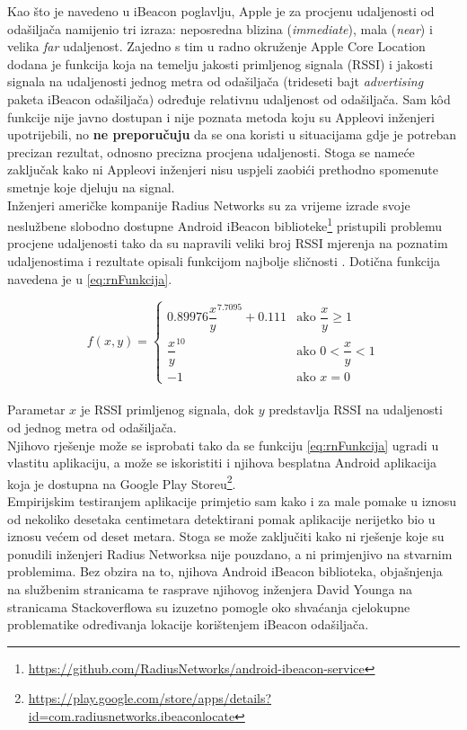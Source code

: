 Kao što je navedeno u iBeacon poglavlju, Apple je za procjenu udaljenosti od odašiljača namijenio tri izraza: neposredna blizina (\textit{immediate}), mala (\textit{near}) i velika \textit{far} udaljenost.
Zajedno s tim u radno okruženje Apple Core Location dodana je funkcija koja na temelju jakosti primljenog signala (RSSI) i jakosti signala na udaljenosti jednog metra od odašiljača (trideseti bajt \textit{advertising} paketa iBeacon odašiljača) određuje relativnu udaljenost od odašiljača. 
Sam kôd funkcije nije javno dostupan i nije poznata metoda koju su Appleovi inženjeri upotrijebili, no \textbf{ne preporučuju} da se ona koristi u situacijama gdje je potreban precizan rezultat, odnosno precizna procjena udaljenosti. 
Stoga se nameće zaključak kako ni Appleovi inženjeri nisu uspjeli zaobići prethodno spomenute smetnje koje djeluju na signal.
\\

Inženjeri američke kompanije Radius Networks su za vrijeme izrade svoje neslužbene slobodno dostupne Android iBeacon biblioteke\footnote{\url{https://github.com/RadiusNetworks/android-ibeacon-service}} pristupili problemu procjene udaljenosti tako da su napravili veliki broj RSSI mjerenja na poznatim udaljenostima i rezultate opisali funkcijom najbolje sličnosti \citep{stackoverflowRadiusDistancing}. 
Dotična funkcija navedena je u \eqref{eq:rnFunkcija}.

\begin{equation}
	\label{eq:rnFunkcija}
	f(x,y) = 
	\begin{cases}	
	0.89976 {\dfrac{x}{y}}^{7.7095} + 0.111 & \text{ako } \dfrac{x}{y} \geq 1 \\
	{\dfrac{x}{y}}^{10} & \text{ako } 0 < \dfrac{x}{y} < 1 \\
	-1 & \text{ako } x = 0 	
	\end{cases}
\end{equation}
\\

Parametar $x$ je RSSI primljenog signala, dok $y$ predstavlja RSSI na udaljenosti od jednog metra od odašiljača. 
\\

Njihovo rješenje može se isprobati tako da se funkciju \eqref{eq:rnFunkcija} ugradi u vlastitu aplikaciju, a može se iskoristiti i njihova besplatna Android aplikacija koja je dostupna na Google Play Storeu\footnote{\url{https://play.google.com/store/apps/details?id=com.radiusnetworks.ibeaconlocate}}.
\\
Empirijskim testiranjem aplikacije primjetio sam kako i za male pomake u iznosu od nekoliko desetaka centimetara detektirani pomak aplikacije nerijetko bio u iznosu većem od deset metara. 
Stoga se može zaključiti kako ni rješenje koje su ponudili inženjeri Radius Networksa nije pouzdano, a ni primjenjivo na stvarnim problemima. 
Bez obzira na to, njihova Android iBeacon biblioteka, objašnjenja na službenim stranicama te rasprave njihovog inženjera David Younga na stranicama Stackoverflowa su izuzetno pomogle oko shvaćanja cjelokupne problematike određivanja lokacije korištenjem iBeacon odašiljača.
\\

